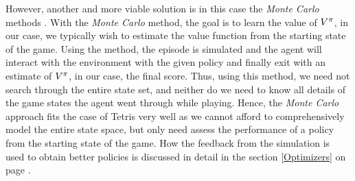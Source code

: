 However, another and more viable solution is in this 
case the \textit{Monte Carlo} methods \citep{Csaba}. 
With the \textit{Monte Carlo} method, the goal is to learn
the value of $V^{\pi}$, in our case, 
we typically wish to estimate the value function from the starting 
state of the game. Using the method, the episode is simulated 
and the agent will interact with the environment with the given policy
and finally exit with an estimate of $V^{\pi}$,
in our case, the final score. Thus, using this method, we need not search 
through the entire state set, and neither do we need to know all
details of the game states the agent went through while playing.
Hence, the \textit{Monte Carlo} approach fits the case of Tetris
very well as we cannot afford to comprehensively  model the entire 
state space, but only need assess the performance of a policy from the 
starting state of the game.
How the feedback from the simulation is used to obtain better policies
is discussed in detail in the section 
\ref{Optimizers} on page \pageref{Optimizers}.










 


